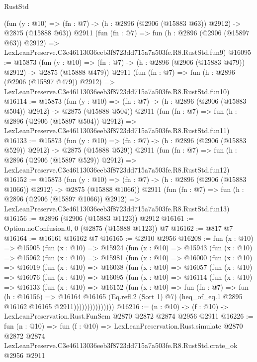 \begin{lexlean}{RustStd}
\begin{coremodule}
    (fun (y : @10) => (fn : @7) -> (h : @2896 (@2906 (@15883 @63)) @2912) -> @2875 (@15888 @63))
    @2911
    (fun (fn : @7) =>
    fun (h : @2896 (@2906 (@15897 @63)) @2912) =>
    LexLeanPreserve.C3e46113036eeb3f8723dd715a7a503fe.R8.RustStd.fun9)
@16095 := @15873
    (fun (y : @10) => (fn : @7) -> (h : @2896 (@2906 (@15883 @479)) @2912) -> @2875 (@15888 @479))
    @2911
    (fun (fn : @7) =>
    fun (h : @2896 (@2906 (@15897 @479)) @2912) =>
    LexLeanPreserve.C3e46113036eeb3f8723dd715a7a503fe.R8.RustStd.fun10)
@16114 := @15873
    (fun (y : @10) => (fn : @7) -> (h : @2896 (@2906 (@15883 @504)) @2912) -> @2875 (@15888 @504))
    @2911
    (fun (fn : @7) =>
    fun (h : @2896 (@2906 (@15897 @504)) @2912) =>
    LexLeanPreserve.C3e46113036eeb3f8723dd715a7a503fe.R8.RustStd.fun11)
@16133 := @15873
    (fun (y : @10) => (fn : @7) -> (h : @2896 (@2906 (@15883 @529)) @2912) -> @2875 (@15888 @529))
    @2911
    (fun (fn : @7) =>
    fun (h : @2896 (@2906 (@15897 @529)) @2912) =>
    LexLeanPreserve.C3e46113036eeb3f8723dd715a7a503fe.R8.RustStd.fun12)
@16152 := @15873
    (fun (y : @10) => (fn : @7) -> (h : @2896 (@2906 (@15883 @1066)) @2912) -> @2875 (@15888 @1066))
    @2911
    (fun (fn : @7) =>
    fun (h : @2896 (@2906 (@15897 @1066)) @2912) =>
    LexLeanPreserve.C3e46113036eeb3f8723dd715a7a503fe.R8.RustStd.fun13)
@16156 := @2896 (@2906 (@15883 @1123)) @2912
@16161 := Option.noConfusion.{0, 0} (@2875 (@15888 @1123)) @7
@16162 := @817 @7
@16164 := @16161 @16162 @7
@16165 := @2910 @2956
@16208 := fun (x : @10) =>
  @15905
    (fun (x : @10) =>
    @15924
      (fun (x : @10) =>
      @15943
        (fun (x : @10) =>
        @15962
          (fun (x : @10) =>
          @15981
            (fun (x : @10) =>
            @16000
              (fun (x : @10) =>
              @16019
                (fun (x : @10) =>
                @16038
                  (fun (x : @10) =>
                  @16057
                    (fun (x : @10) =>
                    @16076
                      (fun (x : @10) =>
                      @16095
                        (fun (x : @10) =>
                        @16114
                          (fun (x : @10) =>
                          @16133
                            (fun (x : @10) =>
                            @16152
                              (fun (x : @10) =>
                              fun (fn : @7) =>
                              fun (h : @16156) =>
                              @16164
                                @16165
                                (Eq.refl.{2} (Sort 1) @7)
                                (heq_of_eq.{1} @2895 @16162 @16165 @2911)))))))))))))))
@16216 := (n : @10) -> (f : @10) -> LexLeanPreservation.Rust.FunSem @2870 @2872 @2874 @2956 @2911
@16226 := fun (n : @10) =>
  fun (f : @10) =>
  LexLeanPreservation.Rust.simulate
    @2870
    @2872
    @2874
    LexLeanPreserve.C3e46113036eeb3f8723dd715a7a503fe.R8.RustStd.crate_ok
    @2956
    @2911
\end{coremodule}
\end{lexlean}
